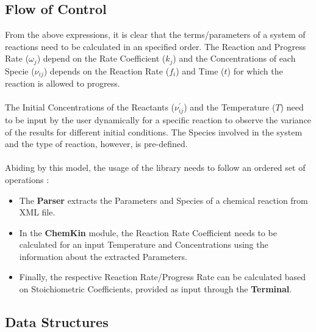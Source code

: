\subsection{Flow of Control}
From the above expressions, it is clear that the terms/parameters of a system of reactions need to be calculated in an specified order. The Reaction and Progress Rate ($\omega_{j}$) depend on the Rate Coefficient ($k_{j}$) and the Concentrations of each Specie (${\nu_{ij}}$) depends on the Reaction Rate ($f_{i}$) and Time ($t$) for which the reaction is allowed to progress. \\
\\The Initial Concentrations of the Reactants ($\nu_{ij}^{\prime}$)  and the Temperature ($T$) need to be input by the user dynamically for a specific reaction to observe the variance of the results for different initial conditions. The Species involved in the system and the type of reaction, however, is pre-defined.\\
\\Abiding by this model, the usage of the library needs to follow an ordered set of operations :
\begin{itemize}
    \item The \textbf{Parser} extracts the Parameters and Species of a chemical reaction from XML file.
    \item In the \textbf{ChemKin} module, the Reaction Rate Coefficient needs to be calculated for an input Temperature and Concentrations using the information about the extracted Parameters.
    \item Finally, the respective Reaction Rate/Progress Rate can be calculated based on Stoichiometric Coefficients, provided as input through the \textbf{Terminal}. 
\end{itemize}

\subsection{Data Structures}
